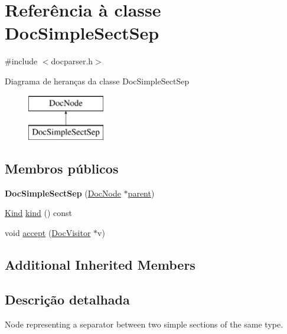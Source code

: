 \hypertarget{class_doc_simple_sect_sep}{\section{Referência à classe Doc\-Simple\-Sect\-Sep}
\label{class_doc_simple_sect_sep}
}


{\ttfamily \#include $<$docparser.\-h$>$}

Diagrama de heranças da classe Doc\-Simple\-Sect\-Sep\begin{figure}[H]
\begin{center}
\leavevmode
\includegraphics[height=2.000000cm]{class_doc_simple_sect_sep}
\end{center}
\end{figure}
\subsection*{Membros públicos}
\begin{DoxyCompactItemize}
\item 
\hypertarget{class_doc_simple_sect_sep_a2ad061e6492e1a57b400ffc958265b0f}{{\bfseries Doc\-Simple\-Sect\-Sep} (\hyperlink{class_doc_node}{Doc\-Node} $\ast$\hyperlink{class_doc_node_abd7f070d6b0a38b4da71c2806578d19d}{parent})}\label{class_doc_simple_sect_sep_a2ad061e6492e1a57b400ffc958265b0f}

\item 
\hyperlink{class_doc_node_aa10c9e8951b8ccf714a59ec321bdac5b}{Kind} \hyperlink{class_doc_simple_sect_sep_aa9d037bed9f9a083d0cd01485637d843}{kind} () const 
\item 
void \hyperlink{class_doc_simple_sect_sep_a7ba716e854ae2f8f87a4eb2140e302b6}{accept} (\hyperlink{class_doc_visitor}{Doc\-Visitor} $\ast$v)
\end{DoxyCompactItemize}
\subsection*{Additional Inherited Members}


\subsection{Descrição detalhada}
Node representing a separator between two simple sections of the same type. 

